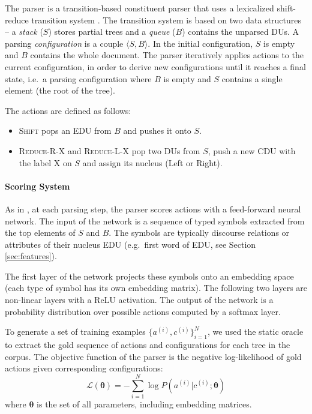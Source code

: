 \documentclass[11pt]{article}
\begin{document}
The parser is a transition-based constituent parser that uses a lexicalized shift-reduce transition system \cite{sagae-2005}.
The transition system is based on two data structures -- a \textit{stack} ($S$) stores partial trees and a \textit{queue} ($B$) contains the unparsed DUs.
A parsing \textit{configuration} is a couple $\langle S, B\rangle$.
In the initial configuration, $S$ is empty and $B$ contains the whole document.
The parser iteratively applies actions to the current configuration, in order
to derive new configurations until it reaches a final state, i.e.\ a parsing
configuration where $B$ is empty and $S$ contains a single element (the root of the tree).

The actions are defined as follows:
\begin{itemize}
    \item \textsc{Shift} pops an EDU from $B$ and pushes it onto $S$.
    \item \textsc{Reduce-R-X} and \textsc{Reduce-L-X} pop two DUs from $S$, push a new CDU with the label X on $S$ and assign its nucleus (Left or Right).
\end{itemize}



\paragraph{Scoring System} As in , at each parsing step,
the parser scores actions with a feed-forward neural network.
The input of the network is a sequence of typed symbols extracted
from the top elements of $S$ and $B$.
The symbols are typically discourse relations or attributes of their nucleus EDU (e.g.\ first word of EDU, see Section \ref{sec:features}).

The first layer of the network projects these symbols onto an embedding
space (each type of symbol has its own embedding matrix).
The following two layers are non-linear layers with a ReLU activation.
The output of the network is a probability distribution over
possible actions computed by a softmax layer.

To generate a set of training examples $\{ a^{(i)}, c^{(i)}\}_{i=1}^N$,
we used the static oracle to extract the gold sequence of actions and configurations for each tree in the corpus.
The objective function of the parser is the negative
log-likelihood of gold actions given corresponding configurations:
\[ \mathcal{L(\boldsymbol \theta)} = - \sum_{i=1}^N \log P(a^{(i)} | c^{(i)}; \boldsymbol \theta) \]
where $\boldsymbol \theta$ is the set of all parameters, including embedding matrices.
\end{document}
